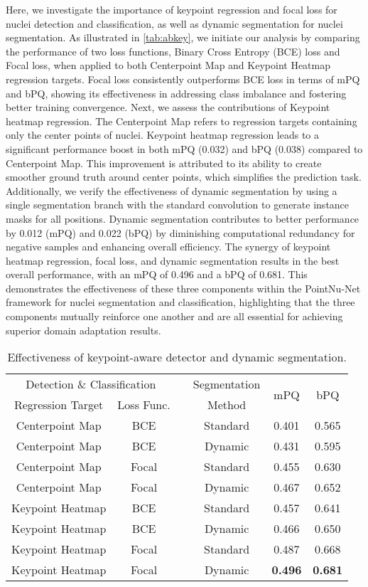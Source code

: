 \documentclass[lettersize,journal]{IEEEtran}
\begin{document}
Here, we investigate the importance of keypoint regression and focal loss for nuclei detection and classification, as well as dynamic segmentation for nuclei segmentation.
As illustrated in \autoref{tab:abkey}, we initiate our analysis by comparing the performance of two loss functions, Binary Cross Entropy (BCE) loss and Focal loss, when applied to both Centerpoint Map and Keypoint Heatmap regression targets. Focal loss consistently outperforms BCE loss in terms of mPQ and bPQ, showing its effectiveness in addressing class imbalance and fostering better training convergence.
Next, we assess the contributions of Keypoint heatmap regression. The Centerpoint Map refers to regression targets containing only the center points of nuclei. Keypoint heatmap regression leads to a significant performance boost in both mPQ (0.032) and bPQ (0.038) compared to Centerpoint Map. This improvement is attributed to its ability to create smoother ground truth around center points, which simplifies the prediction task.
Additionally, we verify the effectiveness of dynamic segmentation by using a single segmentation branch with the standard convolution to generate instance masks for all positions. Dynamic segmentation contributes to better performance by 0.012 (mPQ) and 0.022 (bPQ) by diminishing computational redundancy for negative samples and enhancing overall efficiency.
The synergy of keypoint heatmap regression, focal loss, and dynamic segmentation results in the best overall performance, with an mPQ of 0.496 and a bPQ of 0.681. This demonstrates the effectiveness of these three components within the PointNu-Net framework for nuclei segmentation and classification, highlighting that the three components mutually reinforce one another and are all essential for achieving superior domain adaptation results.

\begin{table}[t]
\setlength\tabcolsep{4.5 pt}
\centering
\caption{Effectiveness of keypoint-aware detector and dynamic segmentation.}
\begin{tabular}{cclccc}
\toprule
\multicolumn{2}{c}{Detection \& Classification} &  & Segmentation & \multirow{2}{*}{mPQ} & \multirow{2}{*}{bPQ} \\ \cmidrule{1-2} \cmidrule{4-4}
Regression Target & Loss Func. &  & Method &  &  \\ \midrule
Centerpoint Map & BCE &  & Standard & 0.401 & 0.565 \\
Centerpoint Map & BCE &  & Dynamic & 0.431 & 0.595 \\
Centerpoint Map & Focal &  & Standard & 0.455 & 0.630 \\
Centerpoint Map & Focal &  & Dynamic & 0.467 & 0.652 \\
Keypoint Heatmap & BCE &  & Standard & 0.457 & 0.641 \\
Keypoint Heatmap & BCE &  & Dynamic & 0.466 & 0.650 \\
Keypoint Heatmap & Focal &  & Standard & 0.487 & 0.668 \\
Keypoint Heatmap & Focal &  & Dynamic & \textbf{0.496} & \textbf{0.681}\\\bottomrule
\end{tabular}
\label{tab:abkey}
\end{table}
\end{document}

